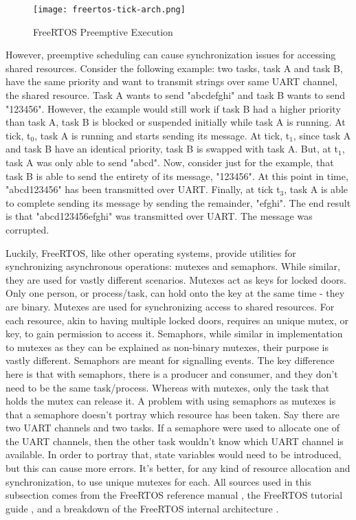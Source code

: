 \begin{figure}[h]
\centering
\texttt{[image: freertos-tick-arch.png]}
\caption{FreeRTOS Preemptive Execution}
\label{fig:freertos-tick-arch}
\end{figure}

However, preemptive scheduling can cause synchronization issues for accessing
shared resources.  Consider the following example: two tasks, task A and task B,
have the same priority and want to transmit strings over same UART channel, the
shared resource. Task A wants to send "abcdefghi" and task B wants to send
"123456".  However, the example would still work if task B had a higher priority
than task A, task B is blocked or suspended initially while task A is running.
At tick, t$_0$, task A is running and starts sending its message. At tick,
t$_1$, since task A and task B have an identical priority, task B is swapped
with task A.  But, at t$_1$, task A was only able to send "abcd". Now, consider
just for the example, that task B is able to send the entirety of its message,
"123456". At this point in time, "abcd123456" has been transmitted over UART.
Finally, at tick t$_3$, task A is able to complete sending its message by
sending the remainder, "efghi". The end result is that "abcd123456efghi" was
transmitted over UART. The message was corrupted. 

Luckily, FreeRTOS, like other operating systems, provide utilities for
synchronizing asynchronous operations: mutexes and semaphors. While similar,
they are used for vastly different scenarios.  Mutexes act as keys for locked
doors. Only one person, or process/task, can hold onto the key at the same time
- they are binary. Mutexes are used for synchronizing access to shared
resources. For each resource, akin to having multiple locked doors, requires an
unique mutex, or key, to gain permission to access it. Semaphors, while similar
in implementation to mutexes as they can be explained as non-binary mutexes,
their purpose is vastly different. Semaphors are meant for signalling events.
The key difference here is that with semaphors, there is a producer and
consumer, and they don't need to be the same task/process. Whereas with mutexes,
only the task that holds the mutex can release it. A problem with using
semaphors as mutexes is that a semaphore doesn't portray which resource has been
taken. Say there are two UART channels and two tasks. If a semaphore were used
to allocate one of the UART channels, then the other task wouldn't know which
UART channel is available. In order to portray that, state variables would need
to be introduced, but this can cause more errors. It's better, for any kind of
resource allocation and synchronization, to use unique mutexes for each. All
sources used in this subsection comes from the FreeRTOS reference manual
\cite{freertos-ref}, the FreeRTOS tutorial guide \cite{freertos-guide}, and
a breakdown of the FreeRTOS internal architecture \cite{about-freertos-arch}.

